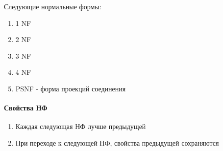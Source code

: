 \documentclass[a4paper, 14pt]{report}
\begin{document}
Следующие нормальные формы:

\begin{enumerate}
    \item 1 NF
    \item 2 NF
    \item 3 NF
    \item 4 NF
    \item PSNF - форма проекций соединения
\end{enumerate}

\paragraph{Свойства НФ}

\begin{enumerate}
    \item Каждая следующая НФ лучше предыдущей
    \item При переходе к следующей НФ, свойства предыдущей сохраняются
\end{enumerate}
\end{document}
